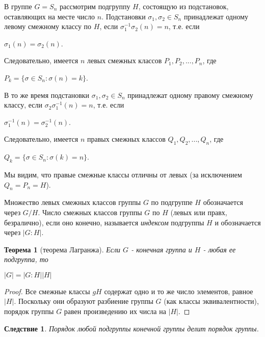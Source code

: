 \begin{example}
В группе $G = S_n$ рассмотрим подгруппу $H$, состоящую из подстановок, оставляющих на месте число $n$. Подстановки $\sigma_1, \sigma_2 \in S_n$ принадлежат одному левому смежному классу по $H$, если $\sigma_1^{-1} \sigma_2(n) = n$, т.е. если
\begin{center}
$\sigma_1(n) = \sigma_2(n)$.
\end{center}
\noindent Следовательно, имеется $n$ левых смежных классов $P_1,P_2, ..., P_n$, где
\begin{center}
$P_k = \{\sigma \in S_n: \sigma(n) = k\}$.
\end{center}
\noindent В то же время подстановки $\sigma_1, \sigma_2 \in S_n$ принадлежат одному правому смежному классу, если $\sigma_2\sigma_1^{-1}(n) = n$, т.е. если
\begin{center}
$\sigma_1^{-1}(n) = \sigma_2^{-1}(n)$.
\end{center}
\noindent Следовательно, имеется $n$ правых смежных классов $Q_1, Q_2, ..., Q_n$, где
\begin{center}
$Q_k = \{\sigma \in S_n: \sigma(k) = n\}$.
\end{center}
\noindent Мы видим, что правые смежные классы отличны от левых (за исключением $Q_n = P_n = H$).
\end{example}

Множество левых смежных классов группы $G$ по подгруппе $H$ обозначается через $G/H$. Число смежных классов группы $G$ по $H$ (левых или правх, безралично), если оно конечно, называется \emph{индексом} подгруппы $H$ и обозначается через $|G:H|$.

\newtheorem{Th}{Теорема}
\begin{Th}[теорема Лагранжа]
\emph{Если $G$ - конечная группа и $H$ - любая ее подгруппа, то}
\begin{center}
$|G| = |G:H||H|$
\end{center}
\end{Th}

\begin{proof}
Все смежные классы $gH$ содержат одно и то же число элементов, равное $|H|$. Поскольку они образуют разбиение группы $G$ (как классы эквивалентности), порядок группы $G$ равен произведению их числа на $|H|$.
\end{proof}

\newtheorem{Sl}{Следствие}
\begin{Sl}
\emph{Порядок любой подгруппы конечной группы делит порядок группы.}
\end{Sl}

